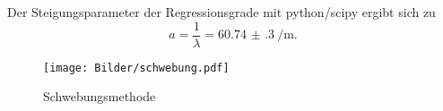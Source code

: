 Der Steigungsparameter der Regressionsgrade mit python/scipy \cite{scipy} ergibt sich zu
\begin{equation*}
	a=\frac{1}{\lambda}=\SI{60.74(30)}{\per\meter} \text{.}
\end{equation*}
\begin{figure}
	\texttt{[image: Bilder/schwebung.pdf]}
	\caption{Schwebungsmethode}
	\label{fig:doppler_schwebung}
\end{figure}
